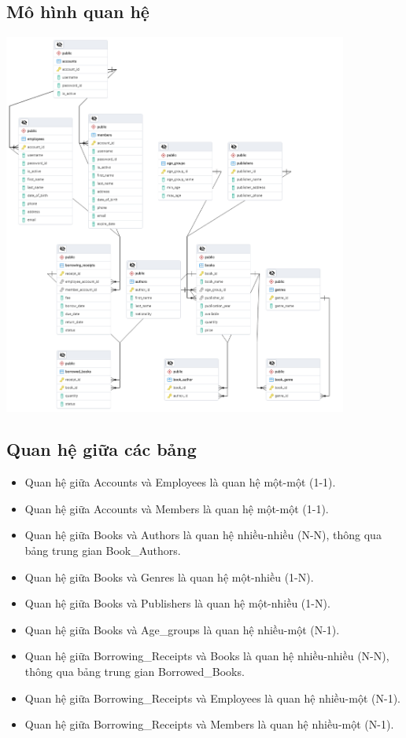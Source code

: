 \documentclass[12pt]{article}
\begin{document}
\subsection{Mô hình quan hệ}
\includegraphics[width=0.85\textwidth]{Untitled.png}
\subsection{Quan hệ giữa các bảng}
\begin{itemize}
    \item Quan hệ giữa Accounts và Employees là quan hệ một-một (1-1).
    \item Quan hệ giữa Accounts và Members là quan hệ một-một (1-1).  
    \item Quan hệ giữa Books và Authors là quan hệ nhiều-nhiều (N-N), thông qua bảng trung gian Book\_Authors.
    \item Quan hệ giữa Books và Genres là quan hệ một-nhiều (1-N).
    \item Quan hệ giữa Books và Publishers là quan hệ một-nhiều (1-N).
    \item Quan hệ giữa Books và Age\_groups là quan hệ nhiều-một (N-1).
    \item Quan hệ giữa Borrowing\_Receipts và Books là quan hệ nhiều-nhiều (N-N), thông qua bảng trung gian Borrowed\_Books.
    \item Quan hệ giữa Borrowing\_Receipts và Employees là quan hệ nhiều-một (N-1).
    \item Quan hệ giữa Borrowing\_Receipts và Members là quan hệ nhiều-một (N-1).
\end{itemize}
\end{document}
